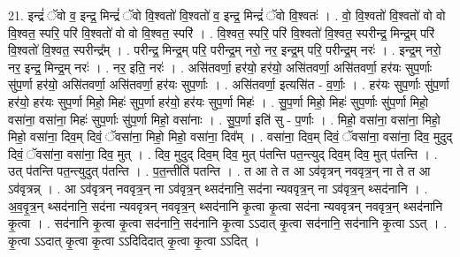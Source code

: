 \documentclass[17pt]{extarticle}
\begin{document}
21. इन्द्रं॑ ॅवो व॒ इन्द्र॒ मिन्द्रं॑ ॅवो वि॒श्वतो॑ वि॒श्वतो॑ व॒ इन्द्र॒ मिन्द्रं॑ ॅवो वि॒श्वतः॑ । . वो॒ वि॒श्वतो॑ वि॒श्वतो॑ वो वो वि॒श्वत॒ स्परि॒ परि॑ वि॒श्वतो॑ वो वो वि॒श्वत॒ स्परि॑ । . वि॒श्वत॒ स्परि॒ परि॑ वि॒श्वतो॑ वि॒श्वत॒ स्परीन्द्र॒ मिन्द्र॒म् परि॑ वि॒श्वतो॑ वि॒श्वत॒ स्परीन्द्र᳚म् । . परीन्द्र॒ मिन्द्र॒म् परि॒ परीन्द्र॒म् नरो॒ नर॒ इन्द्र॒म् परि॒ परीन्द्र॒म् नरः॑ । . इन्द्र॒म् नरो॒ नर॒ इन्द्र॒ मिन्द्र॒म् नरः॑ । . नर॒ इति॒ नरः॑ । . असि॑तवर्णा॒ हर॑यो॒ हर॑यो॒ असि॑तवर्णा॒ असि॑तवर्णा॒ हर॑यः सुप॒र्णाः सु॑प॒र्णा हर॑यो॒ असि॑तवर्णा॒ असि॑तवर्णा॒ हर॑यः सुप॒र्णाः । . असि॑तवर्णा॒ इत्यसि॑त - व॒र्णाः॒ । . हर॑यः सुप॒र्णाः सु॑प॒र्णा हर॑यो॒ हर॑यः सुप॒र्णा मिहो॒ मिहः॑ सुप॒र्णा हर॑यो॒ हर॑यः सुप॒र्णा मिहः॑ । . सु॒प॒र्णा मिहो॒ मिहः॑ सुप॒र्णाः सु॑प॒र्णा मिहो॒ वसा॑ना॒ वसा॑ना॒ मिहः॑ सुप॒र्णाः सु॑प॒र्णा मिहो॒ वसा॑नाः । . सु॒प॒र्णा इति॑ सु - प॒र्णाः । . मिहो॒ वसा॑ना॒ वसा॑ना॒ मिहो॒ मिहो॒ वसा॑ना॒ दिव॒म् दिवं॒ ॅवसा॑ना॒ मिहो॒ मिहो॒ वसा॑ना॒ दिव᳚म् । . वसा॑ना॒ दिव॒म् दिवं॒ ॅवसा॑ना॒ वसा॑ना॒ दिव॒ मुदुद् दिवं॒ ॅवसा॑ना॒ वसा॑ना॒ दिव॒ मुत् । . दिव॒ मुदुद् दिव॒म् दिव॒ मुत् प॑तन्ति पत॒न्त्युद् दिव॒म् दिव॒ मुत् प॑तन्ति । . उत् प॑तन्ति पत॒न्त्युदुत् प॑तन्ति । . प॒त॒न्तीति॑ पतन्ति । . त आ ते त आ ऽव॑वृत्रन् नववृत्र॒न् ना ते त आ ऽव॑वृत्रन्न् । . आ ऽव॑वृत्रन् नववृत्र॒न् ना ऽव॑वृत्र॒न् थ्सद॑नानि॒ सद॑ना न्यववृत्र॒न् ना ऽव॑वृत्र॒न् थ्सद॑नानि । . अ॒व॒वृ॒त्र॒न् थ्सद॑नानि॒ सद॑ना न्यववृत्रन् नववृत्र॒न् थ्सद॑नानि कृ॒त्वा कृ॒त्वा सद॑ना न्यववृत्रन् नववृत्र॒न् थ्सद॑नानि कृ॒त्वा । . सद॑नानि कृ॒त्वा कृ॒त्वा सद॑नानि॒ सद॑नानि कृ॒त्वा ऽऽदात् कृ॒त्वा सद॑नानि॒ सद॑नानि कृ॒त्वा ऽऽत् । . कृ॒त्वा ऽऽदात् कृ॒त्वा कृ॒त्वा ऽऽदिदिदात् कृ॒त्वा कृ॒त्वा ऽऽदित् । \newline
\end{document}
